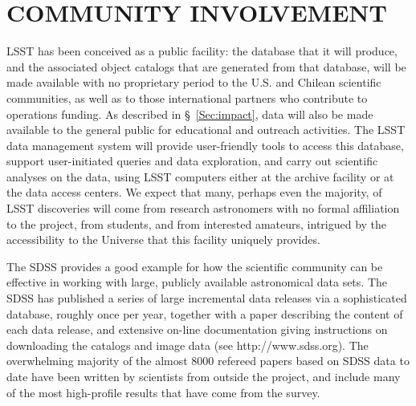 \section{  COMMUNITY INVOLVEMENT   }
\label{Sec:community}
 
LSST has been conceived as a public facility: the database that it will
produce, and the associated object catalogs that are generated from that
database, will be made available with no proprietary period to the
U.S. and Chilean scientific communities, as well as to those
international partners who contribute to operations funding.  As
described in \S~\ref{Sec:impact}, data will also be made available to
the general public for educational and outreach activities.  
The LSST data management 
system will provide user-friendly tools to access this database, support
user-initiated queries and data exploration, and carry out scientific analyses on the
data, using LSST computers either at the archive facility 
or at the data access centers. 
We expect that many, perhaps even the majority,
of LSST discoveries will come from research astronomers with no formal
affiliation to the project, from students, and from interested amateurs, 
intrigued by the accessibility to the Universe that this facility uniquely 
provides. 

The SDSS provides a good example for how the scientific 
community can be effective in working with large, publicly available
astronomical data sets. The SDSS has published a series of large incremental
data releases via a sophisticated database, roughly once per year, together with 
a paper describing the content of each data release, and extensive on-line 
documentation giving instructions on downloading the catalogs and image data
(see http://www.sdss.org). The overwhelming majority of the almost
8000 refereed papers based 
on SDSS data to date have been written by scientists from outside 
the project, and  include many of the most high-profile results that have come 
from the survey. 

